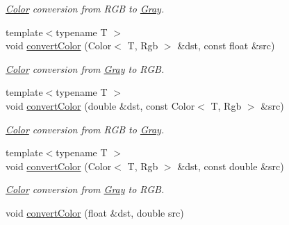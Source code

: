 \begin{DoxyCompactItemize}
\begin{DoxyCompactList}\small\item\em \hyperlink{class_d_o_1_1_color}{Color} conversion from R\-G\-B to \hyperlink{struct_d_o_1_1_gray}{Gray}. \end{DoxyCompactList}\item 
\hypertarget{group___color_conversion_ga9e8d2d7254720f233eed734913c752e0}{{\footnotesize template$<$typename T $>$ }\\void \hyperlink{group___color_conversion_ga9e8d2d7254720f233eed734913c752e0}{convert\-Color} (Color$<$ T, Rgb $>$ \&dst, const float \&src)}\label{group___color_conversion_ga9e8d2d7254720f233eed734913c752e0}

\begin{DoxyCompactList}\small\item\em \hyperlink{class_d_o_1_1_color}{Color} conversion from \hyperlink{struct_d_o_1_1_gray}{Gray} to R\-G\-B. \end{DoxyCompactList}\item 
\hypertarget{group___color_conversion_gae34a9bddf5dfcceeacb4e19819b7832e}{{\footnotesize template$<$typename T $>$ }\\void \hyperlink{group___color_conversion_gae34a9bddf5dfcceeacb4e19819b7832e}{convert\-Color} (double \&dst, const Color$<$ T, Rgb $>$ \&src)}\label{group___color_conversion_gae34a9bddf5dfcceeacb4e19819b7832e}

\begin{DoxyCompactList}\small\item\em \hyperlink{class_d_o_1_1_color}{Color} conversion from R\-G\-B to \hyperlink{struct_d_o_1_1_gray}{Gray}. \end{DoxyCompactList}\item 
\hypertarget{group___color_conversion_gaf00036ce1c3287aa68280ca2e865ef14}{{\footnotesize template$<$typename T $>$ }\\void \hyperlink{group___color_conversion_gaf00036ce1c3287aa68280ca2e865ef14}{convert\-Color} (Color$<$ T, Rgb $>$ \&dst, const double \&src)}\label{group___color_conversion_gaf00036ce1c3287aa68280ca2e865ef14}

\begin{DoxyCompactList}\small\item\em \hyperlink{class_d_o_1_1_color}{Color} conversion from \hyperlink{struct_d_o_1_1_gray}{Gray} to R\-G\-B. \end{DoxyCompactList}\item 
\hypertarget{group___color_conversion_ga8aa17d730c8424cb2b906ecd2c88c024}{void \hyperlink{group___color_conversion_ga8aa17d730c8424cb2b906ecd2c88c024}{convert\-Color} (float \&dst, double src)}\label{group___color_conversion_ga8aa17d730c8424cb2b906ecd2c88c024}


\end{DoxyCompactItemize}
